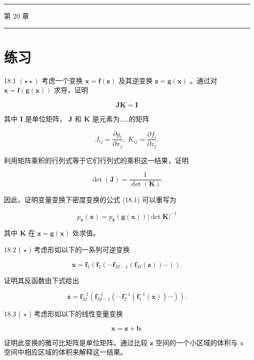 \documentclass[10pt]{article}
\newcommand{\HRule}{\begin{center}\rule{0.9\linewidth}{0.2mm}\end{center}}
\begin{document}
\HRule

第 20 章

\HRule

\section*{练习}

18.1 \(\left( {\star  \star  }\right)\) 考虑一个变换 \(\mathbf{x} = \mathbf{f}\left( \mathbf{z}\right)\) 及其逆变换 \(\mathbf{z} = \mathbf{g}\left( \mathbf{x}\right)\) 。通过对 \(\mathbf{x} = \mathbf{f}\left( {\mathbf{g}\left( \mathbf{x}\right) }\right)\) 求导，证明

\[
\mathbf{{JK}} = \mathbf{I} \tag{18.31}
\]

其中 \(\mathbf{I}\) 是单位矩阵， \(\mathbf{J}\) 和 \(\mathbf{K}\) 是元素为……的矩阵

\[
{J}_{ij} = \frac{\partial {g}_{i}}{\partial {x}_{j}},\;{K}_{ij} = \frac{\partial {f}_{i}}{\partial {z}_{j}}. \tag{18.32}
\]

利用矩阵乘积的行列式等于它们行列式的乘积这一结果，证明

\[
\det \left( \mathbf{J}\right)  = \frac{1}{\det \left( \mathbf{K}\right) }. \tag{18.33}
\]

因此，证明变量变换下密度变换的公式 (18.1) 可以重写为

\[
{p}_{\mathbf{x}}\left( \mathbf{x}\right)  = {p}_{\mathbf{z}}\left( {\mathbf{g}\left( \mathbf{x}\right) }\right) {\left| \det \mathbf{K}\right| }^{-1} \tag{18.34}
\]

其中 \(\mathbf{K}\) 在 \(\mathbf{z} = \mathbf{g}\left( \mathbf{x}\right)\) 处求值。

18.2 ( \(\star\) ) 考虑形如以下的一系列可逆变换

\[
\mathbf{x} = {\mathbf{f}}_{1}\left( {{\mathbf{f}}_{2}\left( {\cdots {\mathbf{f}}_{M - 1}\left( {{\mathbf{f}}_{M}\left( \mathbf{z}\right) }\right) \cdots }\right) }\right) . \tag{18.35}
\]

证明其反函数由下式给出

\[
\mathbf{z} = {\mathbf{f}}_{M}^{-1}\left( {{\mathbf{f}}_{M - 1}^{-1}\left( {\cdots {\mathbf{f}}_{2}^{-1}\left( {{\mathbf{f}}_{1}^{-1}\left( \mathbf{x}\right) }\right) \cdots }\right) }\right) . \tag{18.36}
\]

18.3 ( \(\star\) ) 考虑形如以下的线性变量变换

\[
\mathbf{x} = \mathbf{z} + \mathbf{b}. \tag{18.37}
\]

证明此变换的雅可比矩阵是单位矩阵。通过比较 \(\mathbf{z}\) 空间的一个小区域的体积与 \(\mathrm{x}\) 空间中相应区域的体积来解释这一结果。
\end{document}
